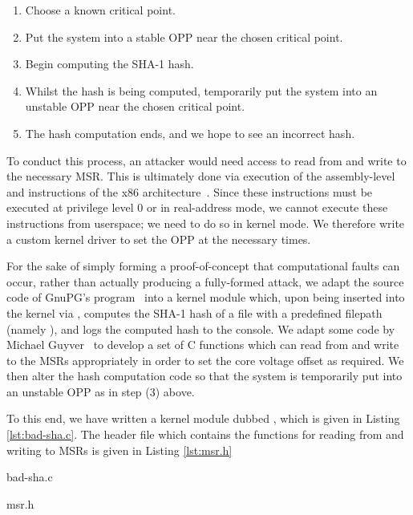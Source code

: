 \begin{enumerate}
    \item Choose a known critical point.
    \item Put the system into a stable OPP near the chosen critical point.
    \item Begin computing the SHA-1 hash.
    \item Whilst the hash is being computed, temporarily put the system into an
        unstable OPP near the chosen critical point.
    \item The hash computation ends, and we hope to see an incorrect hash.
\end{enumerate}

To conduct this process, an attacker would need access to read from and write to
the necessary MSR. This is ultimately done via execution of the assembly-level
 and  instructions of the x86
architecture~\cite[Vol. 2, §§4.3–4]{intelDevManual}. Since these instructions
must be executed at privilege level 0 or in real-address mode, we cannot
execute these instructions from userspace; we need to do so in kernel mode. We
therefore write a custom kernel driver to set the OPP at the necessary times.

For the sake of simply forming a proof-of-concept that computational faults can
occur, rather than actually producing a fully-formed attack, we adapt the source
code of GnuPG's  program~\cite{gnupgSHA} into a kernel module
which, upon being inserted into the kernel via , computes the
SHA-1 hash of a file with a predefined filepath (namely
), and logs the computed hash to the console. We
adapt some code by Michael Guyver~\cite{guyverCode} to develop a set of C
functions which can read from and write to the MSRs appropriately in order to
set the core voltage offset as required. We then alter the hash computation code
so that the system is temporarily put into an unstable OPP as in step (3) above.

To this end, we have written a kernel module dubbed , which is
given in Listing \ref{lst:bad-sha.c}. The header file  which
contains the functions for reading from and writing to MSRs is given in
Listing \ref{lst:msr.h}


    {bad-sha.c}


    {msr.h}
